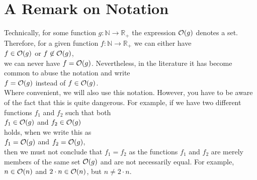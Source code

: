 \section{A Remark on Notation}
Technically, for some function $g:\mathbb{N} \rightarrow \mathbb{R}_+$ the expression $\mathcal{O}(g)$
denotes a set.  Therefore, for a given function $f:\mathbb{N} \rightarrow \mathbb{R}_+$ we can
either have
\\[0.2cm]
\hspace*{1.3cm}
$f \in \mathcal{O}(g)$ \quad or \quad $f \not\in \mathcal{O}(g)$,
\\[0.2cm]
we can never have $f = \mathcal{O}(g)$.  Nevertheless, in the literature it has become common to abuse the
notation and write
\\[0.2cm]
\hspace*{1.3cm}
$f = \mathcal{O}(g)$ \quad instead of \quad $f \in \mathcal{O}(g)$.
\\[0.2cm]
Where convenient, we will also use this notation.  However, you have to be aware of the fact that
this is quite dangerous.  For example, if we have two different functions $f_1$ and
$f_2$ such that both
\\[0.2cm]
\hspace*{1.3cm}
$f_1 \in \mathcal{O}(g)$ \quad and \quad $f_2 \in \mathcal{O}(g)$
\\[0.2cm]
holds, when we write this as
\\[0.2cm]
\hspace*{1.3cm}
$f_1 = \mathcal{O}(g)$ \quad and \quad $f_2 = \mathcal{O}(g)$,
\\[0.2cm]
then we must not conclude that $f_1 = f_2$ as the functions $f_1$ and $f_2$ are merely members of
the same set $\mathcal{O}(g)$ and are not necessarily equal.  For example, $n \in \mathcal{O}(n)$ and 
$2 \cdot n \in \mathcal{O}(n)$,  but $n \not= 2 \cdot n$.
\vspace*{0.3cm}

